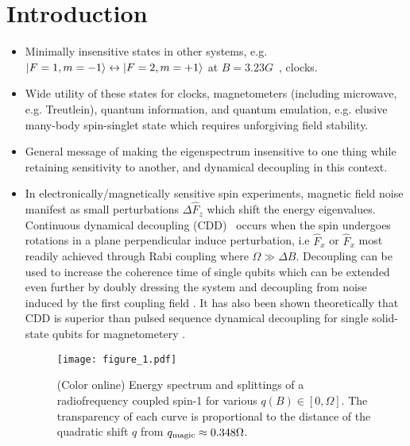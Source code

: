\documentclass[aps,prl,reprint,superscriptaddress,floatfix]{revtex4-1}
\begin{document}
\section{Introduction}
\label{sec:introduction}
\begin{itemize}
    \item Minimally insensitive states in other systems, e.g. $\vert F=1,m=-1 \rangle  \leftrightarrow \vert F=2,m=+1 \rangle $ at $B=3.23\unit{G}$~\cite{matthews_dynamical_1998}, clocks.
    \item Wide utility of these states for clocks, magnetometers (including microwave, e.g. Treutlein), quantum information, and quantum emulation, e.g. elusive many-body spin-singlet state which requires unforgiving field stability.
    \item General message of making the eigenspectrum insensitive to one thing while retaining sensitivity to another, and dynamical decoupling in this context. 
    \item In electronically/magnetically sensitive spin experiments, magnetic field noise manifest as small perturbations $\Delta \hat{F}_{z}$ which shift the energy eigenvalues.
    Continuous dynamical decoupling (CDD)~\cite{facchi_unification_2004,*fanchini_continuously_2007,*aharon_general_2013} occurs when the spin undergoes rotations in a plane perpendicular induce perturbation, i.e $\hat{F}_{x}$ or $\hat{F}_{x}$ most readily achieved through Rabi coupling where $\Omega \gg \Delta B$.
    Decoupling can be used to increase the coherence time of single qubits \cite{golter_protecting_2014} which can be extended even further by doubly dressing the system and decoupling from noise induced by the first coupling field \cite{cai_robust_2012}.
    It has also been shown theoretically that CDD is superior than pulsed sequence dynamical decoupling for single solid-state qubits for magnetometery \cite{hirose_continuous_2012}.
\begin{figure}
    \centering
    \texttt{[image: figure\_1.pdf]}
    \caption{
    \label{fig:eigensystem_schematic}
        (Color online)
        Energy spectrum and splittings of a radiofrequency coupled spin-1 for various $q(B)\in[0,\Omega]$.
        The transparency of each curve is proportional to the distance of the quadratic shift $q$ from $q_{\text{magic}}\approx 0.348\Omega$.
}
\end{figure}
\end{itemize}
\end{document}
